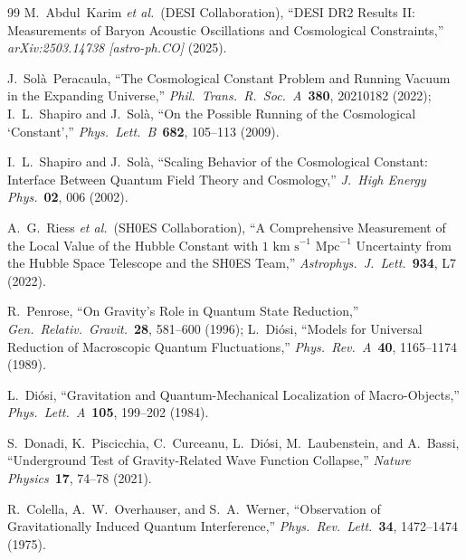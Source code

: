 \documentclass[11pt,a4paper]{article}
\begin{document}
\begin{thebibliography}{99}
M.~Abdul~Karim \emph{et al.}\ (DESI Collaboration), ``DESI DR2 Results II: Measurements of Baryon Acoustic Oscillations and Cosmological Constraints,'' \emph{arXiv:2503.14738 [astro-ph.CO]} (2025).

J.~Sol\`a~Peracaula, ``The Cosmological Constant Problem and Running Vacuum in the Expanding Universe,'' \emph{Phil.\ Trans.\ R.\ Soc.\ A}\ \textbf{380}, 20210182 (2022); I.~L.~Shapiro and J.~Sol\`a, ``On the Possible Running of the Cosmological `Constant','' \emph{Phys.\ Lett.\ B}\ \textbf{682}, 105--113 (2009).

I.~L.~Shapiro and J.~Sol\`a, ``Scaling Behavior of the Cosmological Constant: Interface Between Quantum Field Theory and Cosmology,'' \emph{J.\ High Energy Phys.}\ \textbf{02}, 006 (2002).

A.~G.~Riess \emph{et al.}\ (SH0ES Collaboration), ``A Comprehensive Measurement of the Local Value of the Hubble Constant with $1\text{ km s}^{-1}\text{ Mpc}^{-1}$ Uncertainty from the Hubble Space Telescope and the SH0ES Team,'' \emph{Astrophys.\ J.\ Lett.}\ \textbf{934}, L7 (2022).

R.~Penrose, ``On Gravity's Role in Quantum State Reduction,'' \emph{Gen.\ Relativ.\ Gravit.}\ \textbf{28}, 581--600 (1996); L.~Di\'osi, ``Models for Universal Reduction of Macroscopic Quantum Fluctuations,'' \emph{Phys.\ Rev.\ A}\ \textbf{40}, 1165--1174 (1989).

L.~Di\'osi, ``Gravitation and Quantum-Mechanical Localization of Macro-Objects,'' \emph{Phys.\ Lett.\ A}\ \textbf{105}, 199--202 (1984).

S.~Donadi, K.~Piscicchia, C.~Curceanu, L.~Di\'osi, M.~Laubenstein, and A.~Bassi, ``Underground Test of Gravity-Related Wave Function Collapse,'' \emph{Nature Physics}\ \textbf{17}, 74--78 (2021).

R.~Colella, A.~W.~Overhauser, and S.~A.~Werner, ``Observation of Gravitationally Induced Quantum Interference,'' \emph{Phys.\ Rev.\ Lett.}\ \textbf{34}, 1472--1474 (1975).

\end{thebibliography}
\end{document}
